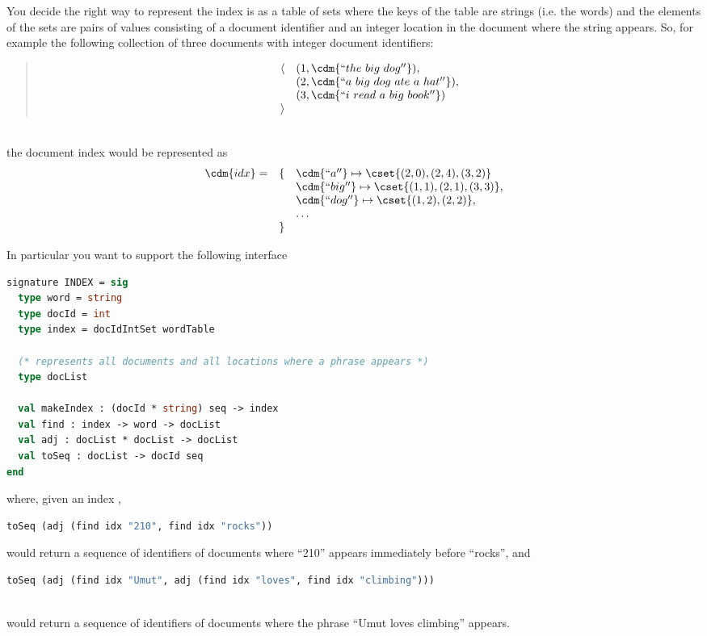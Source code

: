 You decide the right way to represent the index is as a table of sets
where the keys of the table are strings (i.e. the words) and the
elements of the sets are pairs of values consisting of a document
identifier and an integer location in the document where the string
appears.  So, for example the following collection of three documents
with integer document identifiers:
%
\begin{quote}
\[
\begin{array}{ll}
\langle 
& (1, \cdm{``the~big~dog''}), 
\\
& (2, \cdm{``a~big~dog~ate~a~hat''}),
\\
& (3, \cdm{``i~read~a~big~book''})
\\
\rangle
\end{array}
\]
\end{quote}
\\
the document index would be represented as
\[
\begin{array}{lll}
\cdm{idx} = & \{ & \cdm{``a''} \mapsto \cset{(2,0),(2,4),(3,2)}
\\
            &    &  \cdm{``big''} \mapsto \cset{(1,1),(2,1),(3,3)},
\\
            &   & \cdm{``dog''} \mapsto \cset{(1,2),(2,2)},
\\
            &   & \ldots
\\
            & \} &
\end{array}
\]

In particular you want to support the following interface
%
\begin{lstlisting}[language=ocaml,numbers=none]
signature INDEX = sig
  type word = string
  type docId = int
  type index = docIdIntSet wordTable
  
  (* represents all documents and all locations where a phrase appears *)
  type docList

  val makeIndex : (docId * string) seq -> index    
  val find : index -> word -> docList
  val adj : docList * docList -> docList
  val toSeq : docList -> docId seq 
end
\end{lstlisting}
%
where, given an index ,
%
\begin{lstlisting}[language=ocaml,numbers=none]
toSeq (adj (find idx "210", find idx "rocks"))
\end{lstlisting}
%
would return a sequence of identifiers of documents
where ``210'' appears immediately before ``rocks'', and 
\\
\begin{lstlisting}[language=ocaml,numbers=none]
toSeq (adj (find idx "Umut", adj (find idx "loves", find idx "climbing")))
\end{lstlisting}
\\
would return a sequence of identifiers of documents
where the phrase ``Umut loves climbing'' appears.

